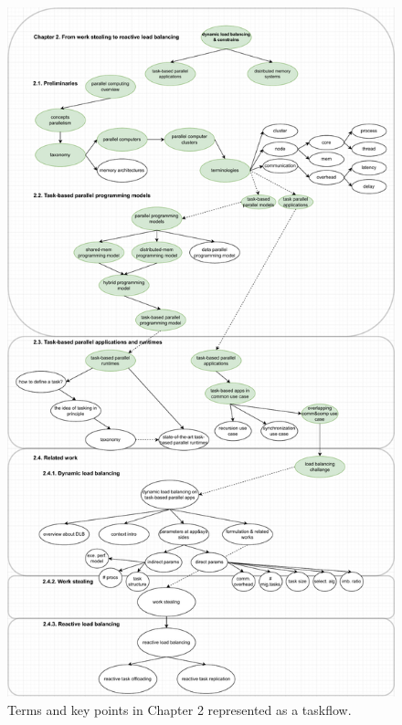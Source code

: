 \begin{figure}[t]
  \centering
  \includegraphics[scale=0.5]{./pictures/thesis_structure/taskflow_chapter2.pdf}
	\caption{Terms and key points in Chapter 2 represented as a taskflow.}
	\label{fig:thesistaskflow_chapter2}
\end{figure}


